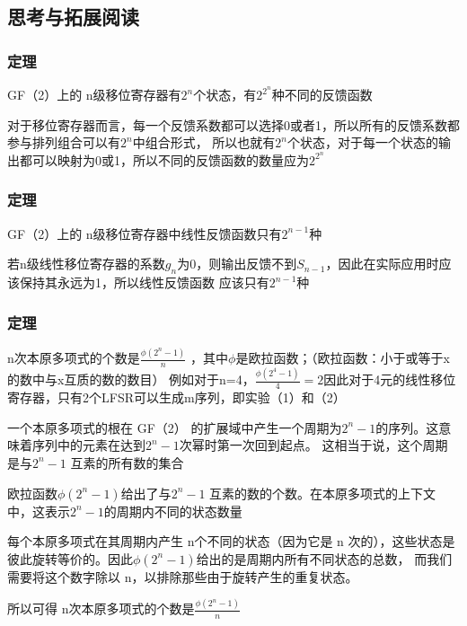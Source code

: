 \documentclass[a4paper,11pt,UTF8]{ctexart}
\begin{document}
\newpage
  \subsection{思考与拓展阅读}

    \subsubsection{定理}
      GF（2）上的 n级移位寄存器有$2^{n}$个状态，有$2^{2^{n}}$种不同的反馈函数\par
      对于移位寄存器而言，每一个反馈系数都可以选择0或者1，所以所有的反馈系数都参与排列组合可以有$2^{n}$中组合形式，
      所以也就有$2^{n}$个状态，对于每一个状态的输出都可以映射为0或1，所以不同的反馈函数的数量应为$2^{2^{n}}$

    \subsubsection{定理}
      GF（2）上的 n级移位寄存器中线性反馈函数只有$2^{n-1}$种\par
      若n级线性移位寄存器的系数$g_{n}$为0，则输出反馈不到$S_{n-1}$，因此在实际应用时应该保持其永远为1，所以线性反馈函数
      应该只有$2^{n-1}$种
    \subsubsection{定理}
      n次本原多项式的个数是$\frac{\phi (2^{n}-1)}{n} $ ，其中$\phi $是欧拉函数；（欧拉函数：小于或等于x的数中与x互质的数的数目）
      例如对于n=4，$\frac{\phi (2^{4}-1)}{4}=2 $因此对于4元的线性移位寄存器，只有2个LFSR可以生成m序列，即实验（1）和（2）\par
      一个本原多项式的根在 GF（2） 的扩展域中产生一个周期为$2^{n}-1$的序列。这意味着序列中的元素在达到$2^{n}-1$次幂时第一次回到起点。
      这相当于说，这个周期是与$2^{n}-1$ 互素的所有数的集合\par
      欧拉函数$\phi (2^{n}-1)$给出了与$2^{n}-1$ 互素的数的个数。在本原多项式的上下文中，这表示$2^{n}-1$的周期内不同的状态数量\par
      每个本原多项式在其周期内产生 n个不同的状态（因为它是 n 次的），这些状态是彼此旋转等价的。因此$\phi (2^{n}-1)$给出的是周期内所有不同状态的总数，
      而我们需要将这个数字除以 n，以排除那些由于旋转产生的重复状态。\par
      所以可得 n次本原多项式的个数是$\frac{\phi (2^{n}-1)}{n} $ 
      
\end{document}
